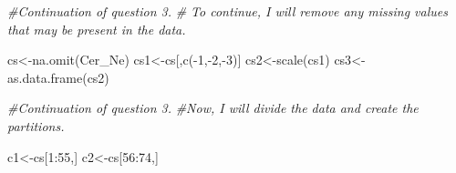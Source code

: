 \documentclass[
]{article}
\newenvironment{Shaded}{\begin{snugshade}}{\end{snugshade}}
\newcommand{\CommentTok}[1]{\textcolor[rgb]{0.56,0.35,0.01}{\textit{#1}}}
\newcommand{\DecValTok}[1]{\textcolor[rgb]{0.00,0.00,0.81}{#1}}
\newcommand{\FunctionTok}[1]{\textcolor[rgb]{0.00,0.00,0.00}{#1}}
\newcommand{\NormalTok}[1]{#1}
\newcommand{\OtherTok}[1]{\textcolor[rgb]{0.56,0.35,0.01}{#1}}
\newcommand{\SpecialCharTok}[1]{\textcolor[rgb]{0.00,0.00,0.00}{#1}}
\begin{document}
\begin{Shaded}
\begin{Highlighting}[]
\CommentTok{\#Continuation of question 3. }
\CommentTok{\# To continue, I will remove any missing values that may be present in the data.}

\NormalTok{cs}\OtherTok{\textless{}{-}}\FunctionTok{na.omit}\NormalTok{(Cer\_Ne)}
\NormalTok{cs1}\OtherTok{\textless{}{-}}\NormalTok{cs[,}\FunctionTok{c}\NormalTok{(}\SpecialCharTok{{-}}\DecValTok{1}\NormalTok{,}\SpecialCharTok{{-}}\DecValTok{2}\NormalTok{,}\SpecialCharTok{{-}}\DecValTok{3}\NormalTok{)]}
\NormalTok{cs2}\OtherTok{\textless{}{-}}\FunctionTok{scale}\NormalTok{(cs1)}
\NormalTok{cs3}\OtherTok{\textless{}{-}}\FunctionTok{as.data.frame}\NormalTok{(cs2)}
\end{Highlighting}
\end{Shaded}

\begin{Shaded}
\begin{Highlighting}[]
\CommentTok{\#Continuation of question 3. }
\CommentTok{\#Now, I will divide the data and create the partitions. }

\NormalTok{c1}\OtherTok{\textless{}{-}}\NormalTok{cs[}\DecValTok{1}\SpecialCharTok{:}\DecValTok{55}\NormalTok{,]}
\NormalTok{c2}\OtherTok{\textless{}{-}}\NormalTok{cs[}\DecValTok{56}\SpecialCharTok{:}\DecValTok{74}\NormalTok{,]}
\end{Highlighting}
\end{Shaded}
\end{document}
